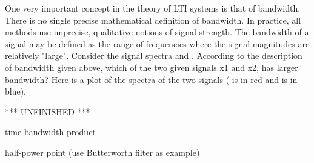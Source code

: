 \documentclass{article}
\begin{document}
\begin{CellGroup}


One very important concept in the theory of LTI systems is that of bandwidth. There is no single precise mathematical definition of bandwidth. In
practice, all methods use imprecise, qualitative notions of signal strength. The bandwidth of a signal may be defined as the range of frequencies
where the signal magnitudes are relatively "large". Consider the signal spectra  and . According to the description of bandwidth given above, which of the two given signals x1 and x2, has larger bandwidth? Here is a plot of the
spectra of the two signals ( is in red and  is in blue).




\begin{CellGroup}

\end{CellGroup}


*** UNFINISHED ***

time-bandwidth product

half-power point (use Butterworth filter as example)


\end{CellGroup}
\end{document}
